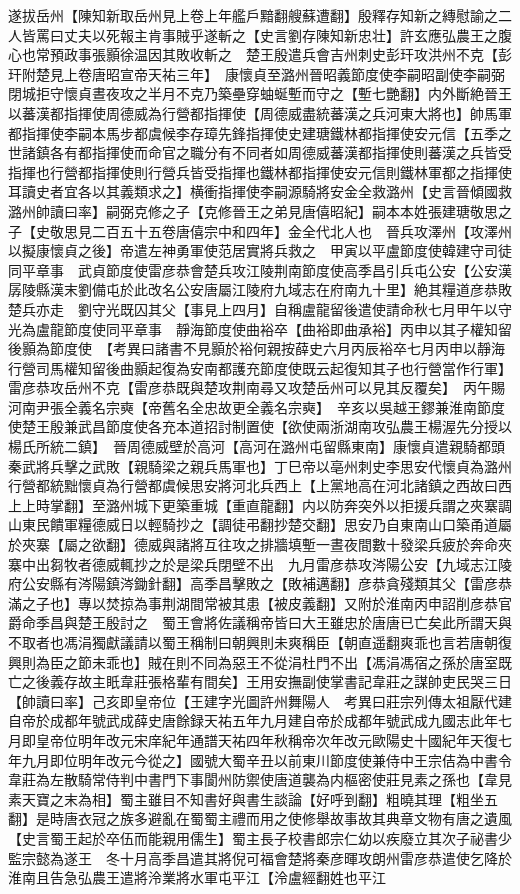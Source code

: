 遂拔岳州【陳知新取岳州見上卷上年艦戶黯翻艘蘇遭翻】殷釋存知新之縳慰諭之二人皆罵曰丈夫以死報主肯事賊乎遂斬之【史言劉存陳知新忠壮】許玄應弘農王之腹心也常預政事張顥徐温因其敗收斬之　楚王殷遣兵會吉州刺史彭玕攻洪州不克【彭玕附楚見上卷唐昭宣帝天祐三年】　康懷貞至潞州晉昭義節度使李嗣昭副使李嗣弼閉城拒守懷貞晝夜攻之半月不克乃築壘穿蚰蜒塹而守之【塹七艷翻】内外斷絶晉王以蕃漢都指揮使周德威為行營都指揮使【周德威盡統蕃漢之兵河東大將也】帥馬軍都指揮使李嗣本馬步都虞候李存璋先鋒指揮使史建瑭鐵林都指揮使安元信【五季之世諸鎮各有都指揮使而命官之職分有不同者如周德威蕃漢都指揮使則蕃漢之兵皆受指揮也行營都指揮使則行營兵皆受指揮也鐵林都指揮使安元信則鐵林軍都之指揮使耳讀史者宜各以其義類求之】横衝指揮使李嗣源騎將安金全救潞州【史言晉傾國救潞州帥讀曰率】嗣弼克修之子【克修晉王之弟見唐僖昭紀】嗣本本姓張建瑭敬思之子【史敬思見二百五十五卷唐僖宗中和四年】金全代北人也　晉兵攻澤州【攻澤州以擬康懷貞之後】帝遣左神勇軍使范居實將兵救之　甲寅以平盧節度使韓建守司徒同平章事　武貞節度使雷彦恭會楚兵攻江陵荆南節度使高季昌引兵屯公安【公安漢孱陵縣漢末劉備屯於此改名公安唐屬江陵府九域志在府南九十里】絶其糧道彦恭敗楚兵亦走　劉守光既囚其父【事見上四月】自稱盧龍留後遣使請命秋七月甲午以守光為盧龍節度使同平章事　靜海節度使曲裕卒【曲裕即曲承裕】丙申以其子權知留後顥為節度使　【考異曰諸書不見顥於裕何親按薛史六月丙辰裕卒七月丙申以靜海行營司馬權知留後曲顥起復為安南都護充節度使既云起復知其子也行營當作行軍】　雷彦恭攻岳州不克【雷彦恭既與楚攻荆南尋又攻楚岳州可以見其反覆矣】　丙午賜河南尹張全義名宗奭【帝舊名全忠故更全義名宗奭】　辛亥以吳越王鏐兼淮南節度使楚王殷兼武昌節度使各充本道招討制置使【欲使兩浙湖南攻弘農王楊渥先分授以楊氏所統二鎮】　晉周德威壁於高河【高河在潞州屯留縣東南】康懷貞遣親騎都頭秦武將兵擊之武敗【親騎梁之親兵馬軍也】丁巳帝以亳州刺史李思安代懷貞為潞州行營都統黜懷貞為行營都虞候思安將河北兵西上【上黨地高在河北諸鎮之西故曰西上上時掌翻】至潞州城下更築重城【重直龍翻】内以防奔突外以拒援兵謂之夾寨調山東民饋軍糧德威日以輕騎抄之【調徒弔翻抄楚交翻】思安乃自東南山口築甬道屬於夾寨【屬之欲翻】德威與諸將互往攻之排牆填塹一晝夜間數十發梁兵疲於奔命夾寨中出芻牧者德威輒抄之於是梁兵閉壁不出　九月雷彦恭攻涔陽公安【九域志江陵府公安縣有涔陽鎮涔鋤針翻】高季昌擊敗之【敗補邁翻】彦恭貪殘類其父【雷彦恭滿之子也】專以焚掠為事荆湖間常被其患【被皮義翻】又附於淮南丙申詔削彦恭官爵命季昌與楚王殷討之　蜀王會將佐議稱帝皆曰大王雖忠於唐唐已亡矣此所謂天與不取者也馮涓獨獻議請以蜀王稱制曰朝興則未爽稱臣【朝直遥翻爽乖也言若唐朝復興則為臣之節未乖也】賊在則不同為惡王不從涓杜門不出【馮涓馮宿之孫於唐室既亡之後義存故主眂韋莊張格輩有間矣】王用安撫副使掌書記韋莊之謀帥吏民哭三日【帥讀曰率】己亥即皇帝位【王建字光圖許州舞陽人　考異曰莊宗列傳太祖厭代建自帝於成都年號武成薛史唐餘録天祐五年九月建自帝於成都年號武成九國志此年七月即皇帝位明年改元宋庠紀年通譜天祐四年秋稱帝次年改元歐陽史十國紀年天復七年九月即位明年改元今從之】國號大蜀辛丑以前東川節度使兼侍中王宗佶為中書令韋莊為左散騎常侍判中書門下事閬州防禦使唐道襲為内樞密使莊見素之孫也【韋見素天寶之末為相】蜀主雖目不知書好與書生談論【好呼到翻】粗曉其理【粗坐五翻】是時唐衣冠之族多避亂在蜀蜀主禮而用之使修舉故事故其典章文物有唐之遺風【史言蜀王起於卒伍而能親用儒生】蜀主長子校書郎宗仁幼以疾廢立其次子祕書少監宗懿為遂王　冬十月高季昌遣其將倪可福會楚將秦彦暉攻朗州雷彦恭遣使乞降於淮南且告急弘農王遣將泠業將水軍屯平江【泠盧經翻姓也平江